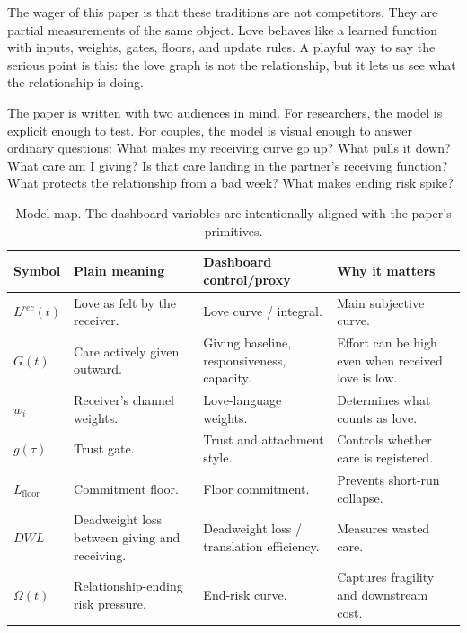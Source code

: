 \documentclass[11pt]{article}
\newcommand{\Lfloor}{L_{\mathrm{floor}}}
\newcommand{\Risk}{\Omega}
\begin{document}
The wager of this paper is that these traditions are not competitors. They are partial measurements of the same object. Love behaves like a learned function with inputs, weights, gates, floors, and update rules. A playful way to say the serious point is this: the love graph is not the relationship, but it lets us see what the relationship is doing.

The paper is written with two audiences in mind. For researchers, the model is explicit enough to test. For couples, the model is visual enough to answer ordinary questions: What makes my receiving curve go up? What pulls it down? What care am I giving? Is that care landing in the partner's receiving function? What protects the relationship from a bad week? What makes ending risk spike?

\begin{center}
\end{center}

\begin{table}[ht]
\centering
\small
\begin{tabular}{L{.14\linewidth}L{.28\linewidth}L{.24\linewidth}L{.22\linewidth}}
\toprule
Symbol & Plain meaning & Dashboard control/proxy & Why it matters \\
\midrule
$L^{rec}(t)$ & Love as felt by the receiver. & Love curve / integral. & Main subjective curve. \\
$G(t)$ & Care actively given outward. & Giving baseline, responsiveness, capacity. & Effort can be high even when received love is low. \\
$w_i$ & Receiver's channel weights. & Love-language weights. & Determines what counts as love. \\
$g(\tau)$ & Trust gate. & Trust and attachment style. & Controls whether care is registered. \\
$\Lfloor$ & Commitment floor. & Floor commitment. & Prevents short-run collapse. \\
$DWL$ & Deadweight loss between giving and receiving. & Deadweight loss / translation efficiency. & Measures wasted care. \\
$\Risk(t)$ & Relationship-ending risk pressure. & End-risk curve. & Captures fragility and downstream cost. \\
\bottomrule
\end{tabular}
\caption{Model map. The dashboard variables are intentionally aligned with the paper's primitives.}
\label{tab:model-map}
\end{table}
\end{document}
